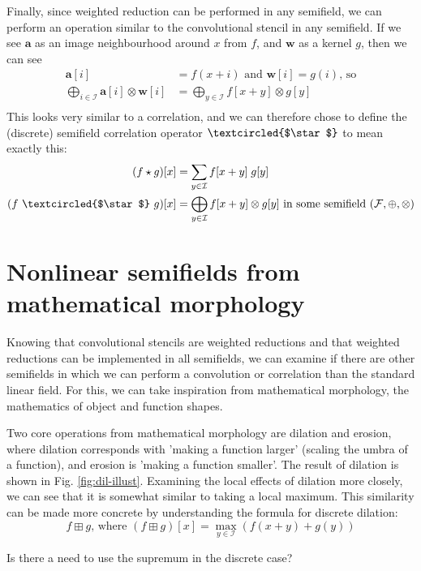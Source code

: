 \documentclass[a4paper, 12pt]{report}
\def\comment#1{\color{red}#1\color{black}}
\begin{document}
Finally, since weighted reduction can be performed in any semifield, we can perform an operation similar to the convolutional stencil in any semifield. If we see $\mathbf{a}$ as an image neighbourhood around $x$ from $f$, and $\mathbf{w}$ as a kernel $g$, then we can see
\begin{align*}
\mathbf{a}[i] &= f(x + i) \textrm{ and } \mathbf{w}[i] = g(i) \textrm{, so} \\
\bigoplus_{i\in \mathcal{I}}\mathbf{a}[i] \otimes \mathbf{w}[i]
&= \bigoplus_{y\in \mathcal{I}}f[x+y] \otimes g[y] \\
\end{align*}
This looks very similar to a correlation, and we can therefore chose to define the (discrete) semifield correlation operator $\textcircled{$\star$}$ to mean exactly this:
\begin{align*}
	(f \star g)[x] &= \sum_{y\in\mathcal{I}}f[x+y]\; g[y]\\
	(f ~\textcircled{$\star$}~ g)[x] &=\bigoplus_{y\in \mathcal{I}}f[x+y] \otimes g[y] \textrm{ in some semifield $(\mathcal{F}, \oplus, \otimes)$}
\end{align*}
\section{Nonlinear semifields from mathematical morphology}
Knowing that convolutional stencils are weighted reductions and that weighted reductions can be implemented in all semifields, we can examine if there are other semifields in which we can perform a convolution or correlation than the standard linear field. For this, we can take inspiration from mathematical morphology, the mathematics of object and function shapes.

Two core operations from mathematical morphology are dilation and erosion, where dilation corresponds with 'making a function larger' (scaling the umbra of a function), and erosion is 'making a function smaller'. The result of dilation is shown in Fig. \ref{fig:dil-illust}. Examining the local effects of dilation more closely, we can see that it is somewhat similar to taking a local maximum. This similarity can be made more concrete by understanding the formula for discrete dilation: 
$$f \boxplus g \textrm{, where }(f \boxplus g)[x] = \max_{y\in\mathcal{I}} \left(f(x+y) + g(y)\right)$$

\comment{Is there a need to use the supremum in the discrete case?}
\end{document}

